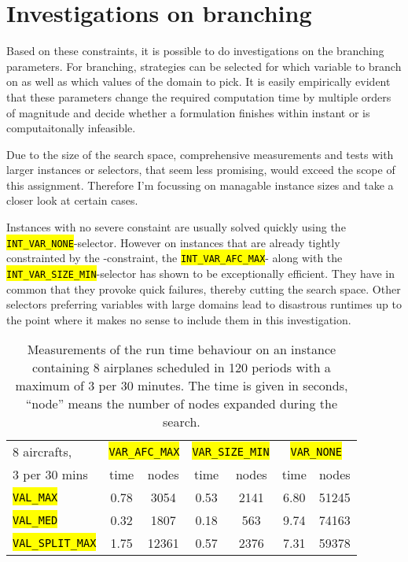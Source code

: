 \documentclass[,%
			paper=a4,%
			DIV12,
			liststotoc,
			bibtotoc,
			draft=false,%
			numbers=noendperiod
			]{scrartcl}
\newcommand{\ilc}[1]{\hl{\texttt{#1}}}
\begin{document}
\section{Investigations on branching}
Based on these constraints, it is possible to do investigations on the branching parameters. 
For branching, strategies can be selected for which variable to branch on as well as which values of the domain to pick.
It is easily empirically evident that these parameters change the required computation time by multiple orders of magnitude and decide whether a formulation finishes within instant or is computaitonally infeasible.

Due to the size of the search space, comprehensive measurements and tests with larger instances or selectors, that seem less promising, would exceed the scope of this assignment. Therefore I'm focussing on managable instance sizes and take a closer look at certain cases.

Instances with no severe constaint are usually solved quickly using the \ilc{INT\_VAR\_NONE}-selector.
However on instances that are already tightly constrainted by the \Clandings-constraint, the \ilc{INT\_VAR\_AFC\_MAX}- along with the \ilc{INT\_VAR\_SIZE\_MIN}-selector has shown to be exceptionally efficient.
They have in common that they provoke quick failures, thereby cutting the search space. Other selectors preferring variables with large domains lead to disastrous runtimes up to the point where it makes no sense to include them in this investigation.


\begin{table}[htbp]
	\centering
	\begin{tabular}{|p{6.5em}|c|c|c|c|c|c|}
	\hline
		 8 aircrafts,
		 & \multicolumn{2}{c|}{\ilc{VAR\_AFC\_MAX}} &
			\multicolumn{2}{c|}{\ilc{VAR\_SIZE\_MIN}}  &
			\multicolumn{2}{c|}{\ilc{VAR\_NONE}}   \\
	 3 per 30 mins&
	 
	 		time & nodes &
	  	time & nodes &
	    time & nodes \\ \hline

		 \ilc{VAL\_MAX}

		 & 0.78 & 3054
		 & 0.53 & 2141
		 & 6.80 & 51245 

		 \\ \hline
		 \ilc{VAL\_MED}

		 & 0.32 & 1807
		 & 0.18 & 563
		 & 9.74 & 74163
	
		 
		 \\ \hline
		 \ilc{VAL\_SPLIT\_MAX}

		 & 1.75 & 12361
		 & 0.57 & 2376
		 & 7.31 & 59378 \\ \hline

	 
\end{tabular}
\caption{Measurements of the run time behaviour on an instance containing 8 airplanes scheduled in 120 periods with a maximum of 3 per 30 minutes. The time is given in seconds, ``node'' means the number of nodes expanded during the search.}
	\label{fig:res1}
\end{table}
\end{document}
